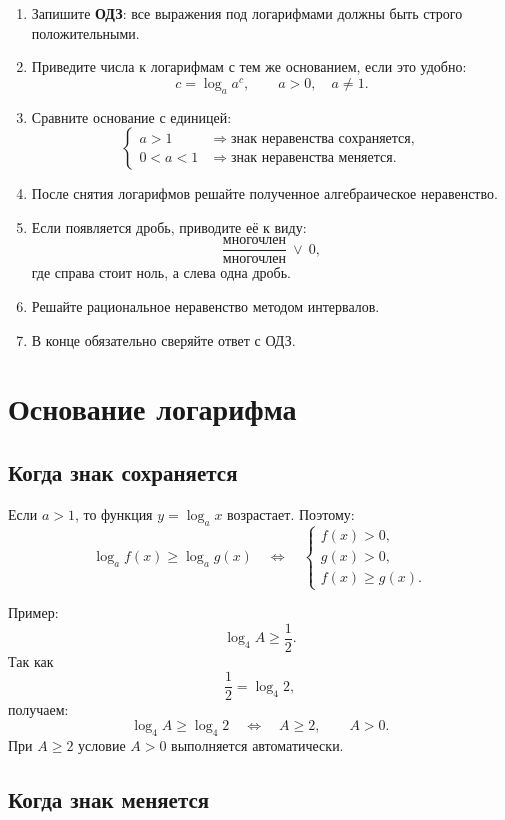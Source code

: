 \documentclass[a4paper,12pt]{article}
\newcommand{\important}[1]{\textcolor{darkaccent}{\textbf{#1}}}
\begin{document}
\begin{enumerate}
    \item Запишите \important{ОДЗ}: все выражения под логарифмами должны быть строго положительными.
    \item Приведите числа к логарифмам с тем же основанием, если это удобно:
    \[
        c=\log_a a^c,\qquad a>0,\quad a\ne 1.
    \]
    \item Сравните основание с единицей:
    \[
    \begin{cases}
    a>1 & \Rightarrow \text{знак неравенства сохраняется},\\
    0<a<1 & \Rightarrow \text{знак неравенства меняется}.
    \end{cases}
    \]
    \item После снятия логарифмов решайте полученное алгебраическое неравенство.
    \item Если появляется дробь, приводите её к виду:
    \[
        \frac{\text{многочлен}}{\text{многочлен}}\ \vee\ 0,
    \]
    где справа стоит ноль, а слева одна дробь.
    \item Решайте рациональное неравенство методом интервалов.
    \item В конце обязательно сверяйте ответ с ОДЗ.
\end{enumerate}

\section{Основание логарифма}

\subsection{Когда знак сохраняется}

Если \(a>1\), то функция \(y=\log_a x\) возрастает. Поэтому:
\[
    \log_a f(x) \ge \log_a g(x)
    \quad \Longleftrightarrow \quad
    \begin{cases}
    f(x)>0,\\
    g(x)>0,\\
    f(x)\ge g(x).
    \end{cases}
\]

Пример:
\[
    \log_4 A \ge \frac12.
\]
Так как
\[
    \frac12=\log_4 2,
\]
получаем:
\[
    \log_4 A \ge \log_4 2
    \quad \Longleftrightarrow \quad
    A\ge 2,
    \qquad A>0.
\]
При \(A\ge 2\) условие \(A>0\) выполняется автоматически.

\subsection{Когда знак меняется}
\end{document}
